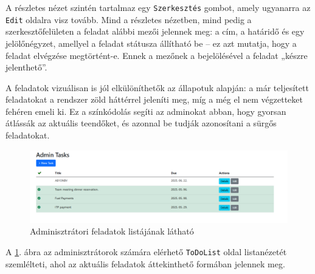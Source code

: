 A részletes nézet szintén tartalmaz egy \texttt{Szerkesztés} gombot, amely ugyanarra az \texttt{Edit} oldalra visz tovább. Mind a részletes nézetben, mind pedig a szerkesztőfelületen a feladat alábbi mezői jelennek meg: a cím, a határidő és egy jelölőnégyzet, amellyel a feladat státusza állítható be – ez azt mutatja, hogy a feladat elvégzése megtörtént-e. Ennek a mezőnek a bejelölésével a feladat „készre jelenthető”.

A feladatok vizuálisan is jól elkülöníthetők az állapotuk alapján: a már teljesített feladatokat a rendszer zöld háttérrel jeleníti meg, míg a még el nem végzetteket fehéren emeli ki. Ez a színkódolás segíti az adminokat abban, hogy gyorsan átlássák az aktuális teendőket, és azonnal be tudják azonosítani a sürgős feladatokat.


\begin{figure}[H]
\centering
\includegraphics[width=1\textwidth]{Szakdolgozat/Mellekletek/admintasks.PNG}
\caption{Adminisztrátori feladatok listájának látható }
\label{fig:todo-detail-admin}
\end{figure}

A \ref{fig:todo-detail-admin}. ábra az adminisztrátorok számára elérhető \texttt{ToDoList} oldal listanézetét szemlélteti, ahol az aktuális feladatok áttekinthető formában jelennek meg.